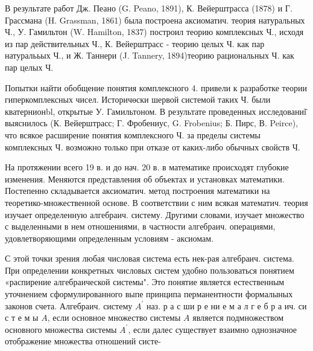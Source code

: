 \documentclass[10pt]{article}
\begin{document}
В результате работ Дж. Пеано (G. Peano, 1891), К. Вейерштрасса (1878) и Г. Грассмана (H. Grassman, 1861) была построена аксиоматич. теория натуральных Ч., У. Гамильтон (W. Hamilton, 1837) построил теорию комплексных Ч., исходя из пар действительных Ч., К. Вейерштрасс - теорию целых Ч. как пар натуралььых Ч., и Ж. Таннери (J. Tannery, 1894)теорию рациональных Ч. как пар целых Ч.



Попытки найти обобщение понятия комплексного 4. привели к разработке теории гиперкомплексных чисел. Историчөски шервой системой таких Ч. были кватернионbl, открытые У. Гамильтоном. В результате проведенных исследованиї̈ выяснилось (К. Вейерштрасс; Г. Фробениус, G. Frobenius; Б. Пирс, В. Peirce), что всякое расширение понятия комплексного Ч. за пределы системы комплексных Ч. возможно только при отказе от каких-либо обычных свойств Ч.



На протяжении всего 19 в. и до нач. 20 в. в математике происходят глубокие изменения. Меняются представления об объектах и установках математики. Постепенно складывается аксиоматич. метод построения математики на теоретико-множественной основе. В соответствии с ним всякая математич. теория изучает определенную алгебраич. систему. Другими словами, изучает множество с выделенными в нем отношениями, в частности алгебраич. операциями, удовлетворяющими определенным условиям - аксиомам.



С этой точки зрения любая числовая система есть нек-рая алгебраич. система. При определении конкретных числовых систем удобно пользоваться понятием «распирение алгебраической системы". Это понятие является естественным уточнением сформулированного выпе принципа перманентности формалыных законов счета. Алгебраич. систему $A^{\prime}$ наз. р а с ши р е ни е м а л г е б р а ич. си с т е м ы $A$, если основное множество системы $A$ является подмножеством основного множества системы $A^{\prime}$, если далес существует взаимно однозначное отображение множества отношений систе-
\end{document}
